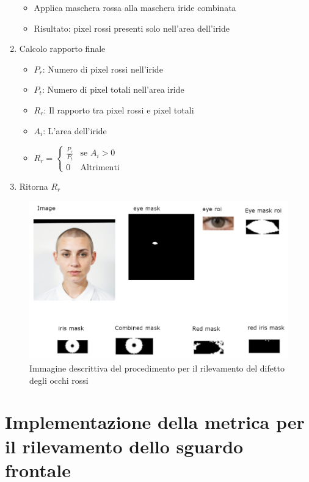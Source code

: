 \documentclass[12pt,a4paper,openright,twoside]{book}
\begin{document}
\begin{enumerate}
\begin{itemize}
        \item Applica maschera rossa alla maschera iride combinata
        \item Risultato: pixel rossi presenti solo nell'area dell'iride
    \end{itemize}
    \item Calcolo rapporto finale \begin{itemize}
        \item \(P_r\):  Numero di pixel rossi nell'iride
        \item \(P_t\): Numero di pixel totali nell'area iride
        \item \(R_r\): Il rapporto tra pixel rossi e pixel totali
        \item \(A_i\): L'area dell'iride
        \item \(R_r = \begin{cases}
            \frac{P_r}{P_t} & \text{se } A_i > 0 \\
             0 & \text{Altrimenti}
        \end{cases}\)
    \end{itemize}
    \item Ritorna $R_r$
\end{enumerate}
\begin{figure}
    \centering
    \includegraphics[width=1\linewidth]{figures/red-eye-process.png}
    \caption{Immagine descrittiva del procedimento per il rilevamento del difetto degli occhi rossi}
    \label{fig:red-eye-process}
\end{figure}

\chapter{Implementazione della metrica per il rilevamento dello sguardo frontale}
\label{chap:frontal_gaze_algo}
\end{document}
